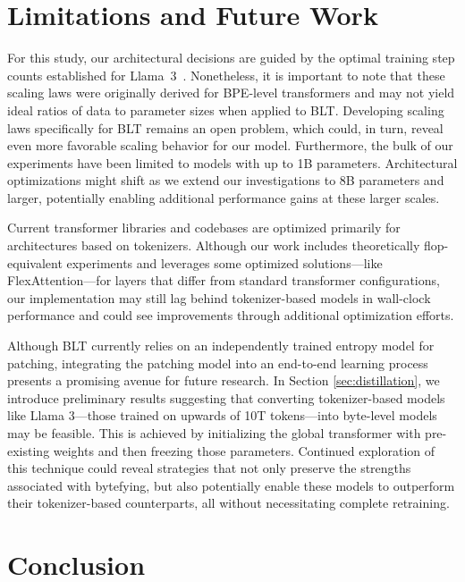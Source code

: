 \section{Limitations and Future Work}

For this study, our architectural decisions are guided by the optimal training step counts established for Llama~3~\citep{dubey2024llama}. Nonetheless, it is important to note that these scaling laws were originally derived for BPE-level transformers and may not yield ideal ratios of data to parameter sizes when applied to {\textsc BLT}. Developing scaling laws specifically for {\textsc BLT} remains an open problem, which could, in turn, reveal even more favorable scaling behavior for our model. Furthermore, the bulk of our experiments have been limited to models with up to 1B parameters. Architectural optimizations might shift as we extend our investigations to 8B parameters and larger, potentially enabling additional performance gains at these larger scales.

Current transformer libraries and codebases are optimized primarily for architectures based on tokenizers. Although our work includes theoretically flop-equivalent experiments and leverages some optimized solutions—like FlexAttention—for layers that differ from standard transformer configurations, our implementation may still lag behind tokenizer-based models in wall-clock performance and could see improvements through additional optimization efforts.

Although {\textsc BLT} currently relies on an independently trained entropy model for patching, integrating the patching model into an end-to-end learning process presents a promising avenue for future research. In Section \ref{sec:distillation}, we introduce preliminary results suggesting that converting tokenizer-based models like Llama 3—those trained on upwards of 10T tokens—into byte-level models may be feasible. This is achieved by initializing the global transformer with pre-existing weights and then freezing those parameters. Continued exploration of this technique could reveal strategies that not only preserve the strengths associated with bytefying, but also potentially enable these models to outperform their tokenizer-based counterparts, all without necessitating complete retraining.

\section{Conclusion}
\label{section:conclusion}

